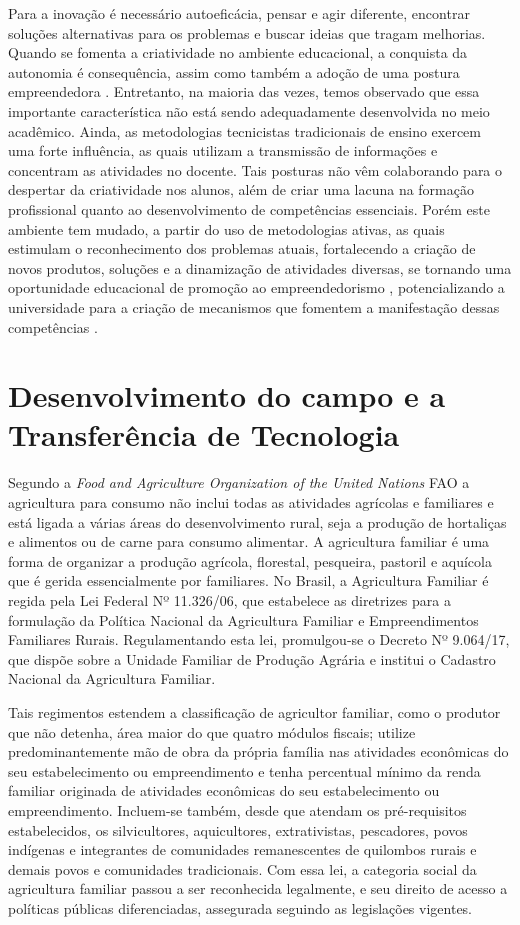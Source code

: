 Para a inovação é necessário autoeficácia, pensar e agir diferente, encontrar soluções alternativas para os problemas e buscar ideias que tragam melhorias. Quando se fomenta a criatividade no ambiente educacional, a conquista da autonomia é consequência, assim como também a adoção de uma postura empreendedora \cite{gonzalez_predictors_2009}. Entretanto, na maioria das vezes, temos observado que essa importante característica não está sendo adequadamente desenvolvida no meio acadêmico. Ainda, as metodologias tecnicistas tradicionais de ensino exercem uma forte influência, as quais utilizam a transmissão de informações e concentram as atividades no docente. Tais posturas não vêm colaborando para o despertar da criatividade nos alunos, além de criar uma lacuna na formação profissional quanto ao desenvolvimento de competências essenciais. Porém este ambiente tem mudado, a partir do uso de metodologias ativas, as quais estimulam o reconhecimento dos problemas atuais, fortalecendo a criação de novos produtos, soluções e a dinamização de atividades diversas, se tornando uma oportunidade educacional de promoção ao empreendedorismo \cite{faria_promocao_2018}, potencializando a universidade para a criação de mecanismos que fomentem a manifestação dessas competências \cite{audy_innovation_2006}.

\section{Desenvolvimento do campo e a Transferência de Tecnologia}

Segundo a \textit{Food and Agriculture Organization of the United Nations} FAO \cite{fao_panorama_2017} a agricultura para consumo não inclui todas as atividades agrícolas e familiares e está ligada a várias áreas do desenvolvimento rural, seja  a produção de hortaliças e alimentos ou de carne para consumo alimentar. A agricultura familiar é uma forma de organizar a produção agrícola, florestal, pesqueira, pastoril e aquícola que é gerida essencialmente por familiares. No Brasil, a Agricultura Familiar é regida pela Lei Federal Nº 11.326/06, que estabelece as diretrizes para a formulação da Política Nacional da Agricultura Familiar e Empreendimentos Familiares Rurais. Regulamentando esta lei, promulgou-se o Decreto Nº 9.064/17, que dispõe sobre a Unidade Familiar de Produção Agrária e institui o Cadastro Nacional da Agricultura Familiar. 

Tais regimentos estendem a classificação de agricultor familiar, como o produtor que não detenha, área maior do que quatro módulos fiscais; utilize predominantemente mão de obra da própria família nas atividades econômicas do seu estabelecimento ou empreendimento e tenha percentual mínimo da renda familiar originada de atividades econômicas do seu estabelecimento ou empreendimento. Incluem-se também, desde que atendam os pré-requisitos estabelecidos, os silvicultores, aquicultores, extrativistas, pescadores, povos indígenas e integrantes de comunidades remanescentes de quilombos rurais e demais povos e comunidades tradicionais. Com essa lei, a categoria social da agricultura familiar passou a ser reconhecida legalmente, e seu direito de acesso a políticas públicas diferenciadas, assegurada seguindo as legislações vigentes.

